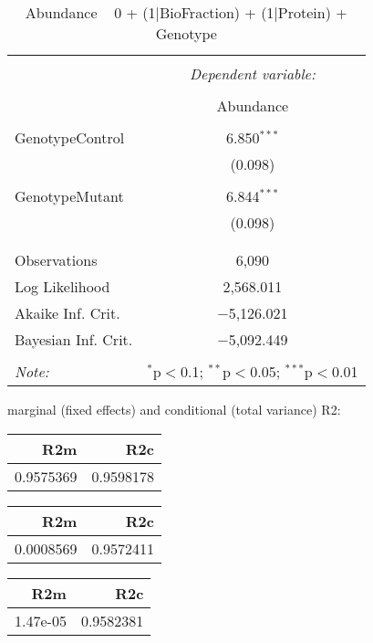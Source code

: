 \documentclass[11pt]{report}
\begin{document}
\begin{table}[!htbp] \centering 
  \caption{Abundance ~ 0 + (1|BioFraction) + (1|Protein) + Genotype} 
  \label{} 
\begin{tabular}{@{\extracolsep{5pt}}lc} 
\\[-1.8ex]\hline 
\hline \\[-1.8ex] 
 & \multicolumn{1}{c}{\textit{Dependent variable:}} \\ 
\cline{2-2} 
\\[-1.8ex] & Abundance \\ 
\hline \\[-1.8ex] 
 GenotypeControl & 6.850$^{***}$ \\ 
  & (0.098) \\ 
  & \\ 
 GenotypeMutant & 6.844$^{***}$ \\ 
  & (0.098) \\ 
  & \\ 
\hline \\[-1.8ex] 
Observations & 6,090 \\ 
Log Likelihood & 2,568.011 \\ 
Akaike Inf. Crit. & $-$5,126.021 \\ 
Bayesian Inf. Crit. & $-$5,092.449 \\ 
\hline 
\hline \\[-1.8ex] 
\textit{Note:}  & \multicolumn{1}{r}{$^{*}$p$<$0.1; $^{**}$p$<$0.05; $^{***}$p$<$0.01} \\ 
\end{tabular} 
\end{table} 
marginal (fixed effects) and conditional (total variance) R2:

\begin{tabular}{r|r}
\hline
R2m & R2c\\
\hline
0.9575369 & 0.9598178\\
\hline
\end{tabular}

\begin{tabular}{r|r}
\hline
R2m & R2c\\
\hline
0.0008569 & 0.9572411\\
\hline
\end{tabular}

\begin{tabular}{r|r}
\hline
R2m & R2c\\
\hline
1.47e-05 & 0.9582381\\
\hline
\end{tabular}
\end{document}
